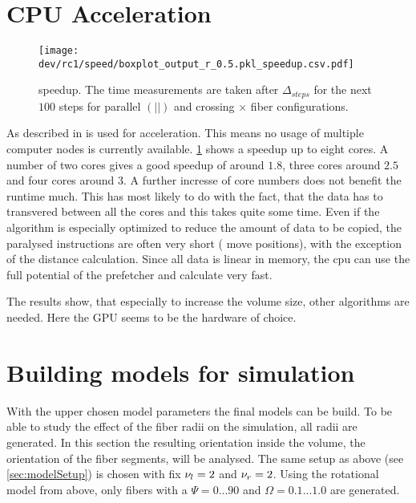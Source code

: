 \section{CPU Acceleration}
% 
\begin{figure}[!t]
\centering
\texttt{[image: dev/rc1/speed/boxplot\_output\_r\_0.5.pkl\_speedup.csv.pdf]}
\caption[ speedup]{ speedup. The time measurements are taken after $\Delta_{\mathit{steps}}$ for the next $100$ steps for parallel $(||)$ and crossing $\times$ fiber configurations.}
\label{fig:solverSpeedup}
\end{figure}
% 
As described in \dummy{} \openmp{} is used for acceleration.
This means no usage of multiple computer nodes is currently available.
\cref{fig:solverSpeedup} shows a speedup up to eight cores.
A number of two cores gives a good speedup of around $1.8$, three cores around $2.5$ and four cores around $3$.
A further incresse of core numbers does not benefit the runtime much.
This has most likely to do with the fact, that the data has to transvered between all the cores and this takes quite some time.
Even if the algorithm is especially optimized to reduce the amount of data to be copied, the paralysed instructions are often very short (\eg{} move positions), with the exception of the distance calculation.
Since all data is linear in memory, the cpu can use the full potential of the prefetcher and calculate very fast.
\par
% 
The results show, that especially to increase the volume size, other algorithms are needed. 
Here the \ac{GPU} seems to be the hardware of choice.
% 
% 
% 
\section{Building models for simulation}
% 
With the upper chosen model parameters the final models can be build.
To be able to study the effect of the fiber radii on the simulation, all radii are generated.
In this section the resulting orientation inside the volume, \ie{} the orientation of the fiber segments, will be analysed.
The same setup as above (see \cref{sec:modelSetup}) is chosen with fix $\textnormal{$\nu_{l}$}=\SI{2}{}$ and $\textnormal{$\nu_{r}$} = \SI{2}{}$.
Using the rotational model from above, only fibers with a $\Psi =  0...90$ and $\Omega = 0.1...1.0$ are generated.
% 
% 
% 
